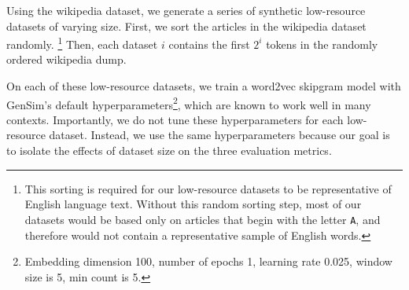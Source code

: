 \documentclass[11pt,a4paper]{article}
\begin{document}
Using the wikipedia dataset, we generate a series of synthetic low-resource datasets of varying size.
First, we sort the articles in the wikipedia dataset randomly.%
\footnote{
    This sorting is required for our low-resource datasets to be representative of English language text.
    Without this random sorting step,
    most of our datasets would be based only on articles that begin with the letter \texttt{A},
    and therefore would not contain a representative sample of English words.
}
Then, each dataset $i$ contains the first $2^i$ tokens in the randomly ordered wikipedia dump.

On each of these low-resource datasets,
we train a word2vec skipgram model with GenSim's default hyperparameters\footnote{
Embedding dimension 100, number of epochs 1, learning rate 0.025, window size is 5, min count is 5.
},
which are known to work well in many contexts.
Importantly, we do not tune these hyperparameters for each low-resource dataset.
Instead, we use the same hyperparameters because our goal is to isolate the effects of dataset size on the three evaluation metrics.
\end{document}
